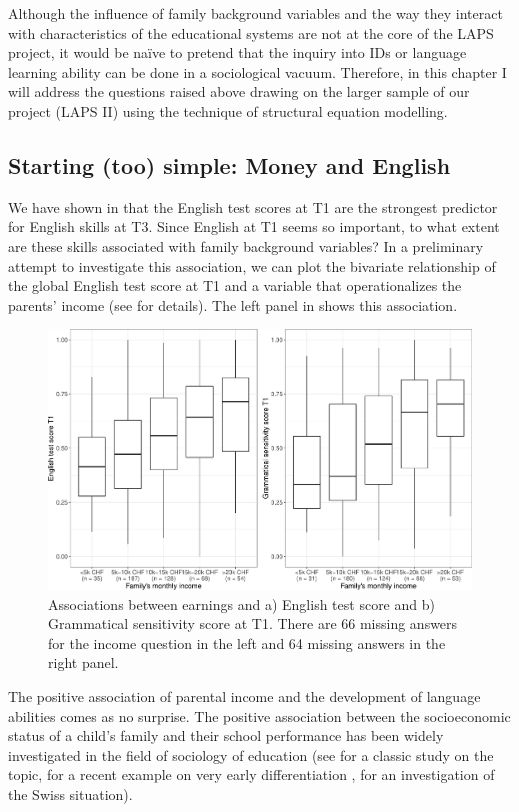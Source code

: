 \documentclass[output=paper]{langsci/langscibook}
\begin{document}
Although the influence of family background variables and the way they interact with characteristics of the educational systems are not at the core of the LAPS project, it would be naïve to pretend that the inquiry into IDs or language learning ability can be done in a sociological vacuum. Therefore, in this chapter I will address the questions raised above drawing on the larger sample of our project (LAPS II) using the technique of structural equation modelling.

\subsection{Starting (too) simple: Money and English}\largerpage[1.5]

We have shown in  that the English test scores at T1 are the strongest predictor for English skills at T3. Since English at T1 seems so important, to what extent are these skills associated with family background variables? In a preliminary attempt to investigate this association, we can plot the bivariate relationship of the global English test score at T1 and a variable that operationalizes the parents’ income (see  for details). The left panel in  shows this association.

  
\begin{figure}
\includegraphics[width=\textwidth]{figures/Figure5.1.pdf}
\caption{Associations between earnings and a) English test score and b) Grammatical sensitivity score at T1. There are 66 missing answers for the income question in the left and 64 missing answers in the right panel.\label{fig:05:1}}
\end{figure}

The positive association of parental income and the development of language abilities comes as no surprise. The positive association between the socioeconomic status of a child’s family and their school performance has been widely investigated in the field of sociology of education (see \citealt{EntwisleAlexander1992} for a classic study on the topic, \citealt{FernaldEtAl2013} for a recent example on very early differentiation , \citealt{HäberlinEtAl2005} for an investigation of the Swiss situation).
\end{document}
